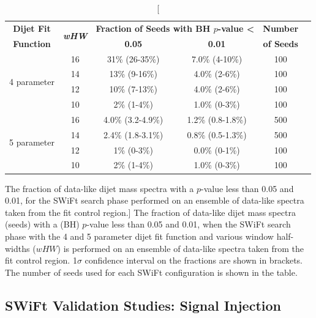 \begin{table}[!htb]
\centering
\begin{tabular}{|c|c||c|c|c|c|}
  \hline
   \textbf{Dijet Fit}  & \multirow{2}{*}{\textbf{\textit{wHW}}} &\multicolumn{2}{c|}{\textbf{Fraction of Seeds with BH \mbox{$p$-value} \textless}} &   \textbf{Number}   \\ \cline{3-4} 
   \textbf{Function}   &                        & \textbf{0.05}                & \textbf{0.01}                                               &  \textbf{of Seeds}  \\ 
  \hline
  \multirow{4}{*}{4 parameter} &   16 &  31\%   (26-35\%)   &  7.0\% (4-10\%)  & 100  \\
   &   14 &  13\%   (9-16\%)    &  4.0\% (2-6\%)   & 100  \\
   &   12 &  10\%   (7-13\%)    &  4.0\% (2-6\%)   & 100  \\
   &   10 &  2\%   (1-4\%)      &  1.0\% (0-3\%)   & 100  \\
  \hline
  \multirow{4}{*}{5 parameter} &   16 &  4.0\% (3.2-4.9\%)  &  1.2\% (0.8-1.8\%) & 500  \\
  &   14 &  2.4\% (1.8-3.1\%)  &  0.8\% (0.5-1.3\%) & 500  \\
  &   12 &  1\%   (0-3\%)      &  0.0\%  (0-1\%)  & 100  \\
  &   10 &  2\%   (1-4\%)      &  1.0\%  (0-3\%)  & 100  \\
  \hline
\end{tabular}
\caption
    [ The fraction of data-like dijet mass spectra
      with a \bh{} \mbox{$p$-value} less than 0.05 and 0.01,
      for the SWiFt search phase performed on an ensemble of data-like spectra
      taken from the \lm{} fit control region.]
    {\label{tab:bumpH_lm_spuriousSignal}
      The fraction of data-like dijet mass spectra (seeds) 
      with a \bh{} (BH) \mbox{$p$-value} less than 0.05 and 0.01,
      when the SWiFt search phase with the 4 and 5 parameter dijet fit function
      and various window half-widths ($wHW$) is performed on an ensemble of data-like spectra
      taken from the \lm{} fit control region.
      1$\sigma$ confidence interval on the fractions are shown in brackets.
      The number of seeds used for each SWiFt configuration is shown in the table.}
    \vspace{-0.5em}
\end{table}
\newpage

\subsection{SWiFt Validation Studies: Signal Injection}
\label{sec:bkg-full_signalInj}


